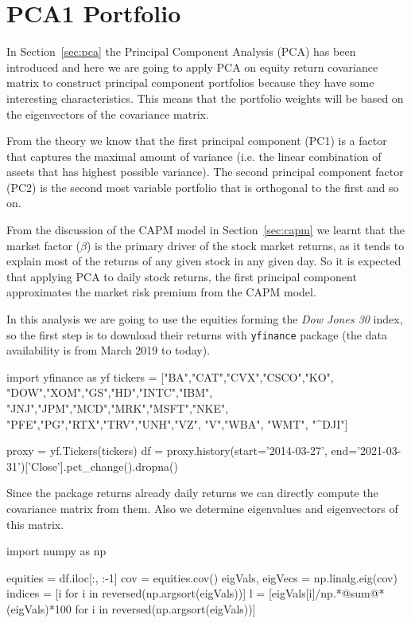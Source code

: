 \section{PCA1 Portfolio}
\label{portfolio-optimization-and-pca}

In Section~\ref{sec:pca} the Principal Component Analysis (PCA) has been introduced and here we are going to apply PCA on equity return covariance matrix to construct principal component portfolios because they have some interesting characteristics. This means that the portfolio weights will be based on the eigenvectors of the covariance matrix.

From the theory we know that the first principal component (PC1) is a factor that captures the maximal amount of variance (i.e. the linear combination of assets that has highest possible variance). The second principal component factor (PC2) is the second most variable portfolio that is orthogonal to the first and so on.

From the discussion of the CAPM model in Section~\ref{sec:capm} we learnt that the market factor ($\beta$) is the primary driver of the stock market returns, as it tends to explain most of the returns of any given stock in any given day.
So it is expected that applying PCA to daily stock returns, the first principal component approximates the market risk premium from the CAPM model.

In this analysis we are going to use the equities forming the \emph{Dow Jones 30} index, so the first step is to download their returns with \texttt{yfinance} package (the data availability is from March 2019 to today).
	
\begin{ipython}
import yfinance as yf
tickers = ["BA","CAT","CVX","CSCO","KO",
           "DOW","XOM","GS","HD","INTC","IBM",
           "JNJ","JPM","MCD","MRK","MSFT","NKE",
           "PFE","PG","RTX","TRV","UNH","VZ",
           "V","WBA", "WMT", "^DJI"]

proxy = yf.Tickers(tickers)           
df = proxy.history(start='2014-03-27',
                   end='2021-03-31')['Close'].pct_change().dropna()
\end{ipython}
	
Since the package returns already daily returns we can directly compute the covariance matrix from them. Also we determine eigenvalues and eigenvectors of this matrix.

\begin{ipython}
import numpy as np

equities = df.iloc[:, :-1]
cov = equities.cov()
eigVals, eigVecs = np.linalg.eig(cov)
indices = [i for i in reversed(np.argsort(eigVals))]
l = [eigVals[i]/np.*@sum@*(eigVals)*100 for i in reversed(np.argsort(eigVals))]
\end{ipython}
	
